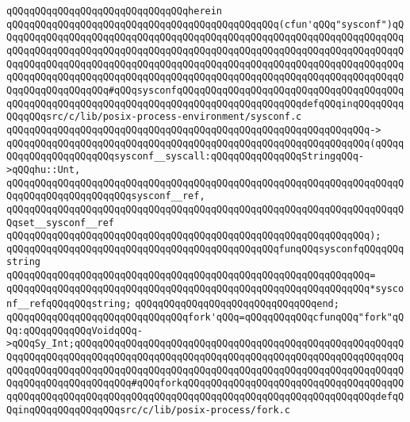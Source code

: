 \verb|qQQqqQQqqQQqqQQqqQQqqQQqqQQqqQQqherein|\newline
\verb|qQQqqQQqqQQqqQQqqQQqqQQqqQQqqQQqqQQqqQQqqQQqqQQq(cfun'qQQq"sysconf")qQQqqQQqqQQqqQQqqQQqqQQqqQQqqQQqqQQqqQQqqQQqqQQqqQQqqQQqqQQqqQQqqQQqqQQqqQQqqQQqqQQqqQQqqQQqqQQqqQQqqQQqqQQqqQQqqQQqqQQqqQQqqQQqqQQqqQQqqQQqqQQqqQQqqQQqqQQqqQQqqQQqqQQqqQQqqQQqqQQqqQQqqQQqqQQqqQQqqQQqqQQqqQQqqQQqqQQqqQQqqQQqqQQqqQQqqQQqqQQqqQQqqQQqqQQqqQQqqQQqqQQqqQQqqQQqqQQqqQQqqQQqqQQqqQQqqQQqqQQq#qQQqsysconfqQQqqQQqqQQqqQQqqQQqqQQqqQQqqQQqqQQqqQQqqQQqqQQqqQQqqQQqqQQqqQQqqQQqqQQqqQQqqQQqqQQqqQQqqQQqdefqQQqinqQQqqQQqqQQqqQQqsrc/c/lib/posix-process-environment/sysconf.c|\newline
\verb|qQQqqQQqqQQqqQQqqQQqqQQqqQQqqQQqqQQqqQQqqQQqqQQqqQQqqQQqqQQqqQQq->|\newline
\verb|qQQqqQQqqQQqqQQqqQQqqQQqqQQqqQQqqQQqqQQqqQQqqQQqqQQqqQQqqQQqqQQq(qQQqqQQqqQQqqQQqqQQqqQQqsysconf__syscall:qQQqqQQqqQQqqQQqStringqQQq->qQQqhu::Unt,|\newline
\verb|qQQqqQQqqQQqqQQqqQQqqQQqqQQqqQQqqQQqqQQqqQQqqQQqqQQqqQQqqQQqqQQqqQQqqQQqqQQqqQQqqQQqqQQqqQQqsysconf__ref,|\newline
\verb|qQQqqQQqqQQqqQQqqQQqqQQqqQQqqQQqqQQqqQQqqQQqqQQqqQQqqQQqqQQqqQQqqQQqqQQqset__sysconf__ref|\newline
\verb|qQQqqQQqqQQqqQQqqQQqqQQqqQQqqQQqqQQqqQQqqQQqqQQqqQQqqQQqqQQqqQQq);|\newline
\newline
\verb|qQQqqQQqqQQqqQQqqQQqqQQqqQQqqQQqqQQqqQQqqQQqqQQqfunqQQqsysconfqQQqqQQqstring|\newline
\verb|qQQqqQQqqQQqqQQqqQQqqQQqqQQqqQQqqQQqqQQqqQQqqQQqqQQqqQQqqQQqqQQq=|\newline
\verb|qQQqqQQqqQQqqQQqqQQqqQQqqQQqqQQqqQQqqQQqqQQqqQQqqQQqqQQqqQQqqQQq*sysconf__refqQQqqQQqstring;|\newline
\verb|qQQqqQQqqQQqqQQqqQQqqQQqqQQqqQQqend;|\newline
\newline
\verb|qQQqqQQqqQQqqQQqqQQqqQQqqQQqqQQqfork'qQQq=qQQqqQQqqQQqcfunqQQq"fork"qQQq:qQQqqQQqqQQqVoidqQQq->qQQqSy_Int;qQQqqQQqqQQqqQQqqQQqqQQqqQQqqQQqqQQqqQQqqQQqqQQqqQQqqQQqqQQqqQQqqQQqqQQqqQQqqQQqqQQqqQQqqQQqqQQqqQQqqQQqqQQqqQQqqQQqqQQqqQQqqQQqqQQqqQQqqQQqqQQqqQQqqQQqqQQqqQQqqQQqqQQqqQQqqQQqqQQqqQQqqQQqqQQqqQQqqQQqqQQqqQQqqQQqqQQqqQQq#qQQqforkqQQqqQQqqQQqqQQqqQQqqQQqqQQqqQQqqQQqqQQqqQQqqQQqqQQqqQQqqQQqqQQqqQQqqQQqqQQqqQQqqQQqqQQqqQQqqQQqqQQqqQQqdefqQQqinqQQqqQQqqQQqqQQqsrc/c/lib/posix-process/fork.c|\newline
\newline
